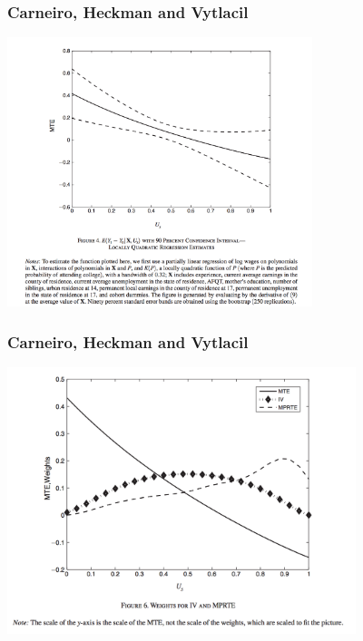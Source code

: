 \documentclass[xcolor=pdftex,dvipsnames,table,mathserif,aspectratio=169]{beamer}
\begin{document}
\begin{frame}
\frametitle{Carneiro, Heckman and Vytlacil}
\begin{center}
\includegraphics[width=3.5in]{./resources/chv_fig4}
\end{center}
\end{frame}

\begin{frame}
\frametitle{Carneiro, Heckman and Vytlacil}
\begin{center}
\includegraphics[width=4in]{./resources/chv_fig6}
\end{center}
\end{frame}
\end{document}

